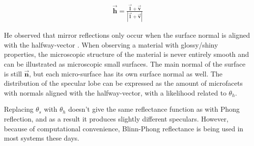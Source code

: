 	\begin{eqnarray*}
		\vec{\mathbf{h}} = \frac{\vec{\mathbf{l}} + \vec{\mathbf{v}}}{|\vec{\mathbf{l}} + \vec{\mathbf{v}}|}
	\end{eqnarray*}

He observed that mirror reflections only occur when the surface normal is aligned with the halfway-vector \cite{DigitalModeling}. When observing a material with glossy/shiny properties, the microscopic structure of the material is never entirely smooth and can be illustrated as microscopic small surfaces. The main normal of the surface is still $\vec{\mathbf{n}}$, but each micro-surface has its own surface normal as well. The distribution of the specular lobe can be expressed as the amount of microfacets with normals aligned with the halfway-vector, with a likelihood related to $\theta_h$.

Replacing $\theta_s$ with $\theta_h$ doesn't give the same reflectance function as with Phong reflection, and as a result it produces slightly different speculars. However, because of computational convenience, Blinn-Phong reflectance is being used in most systems these days.
